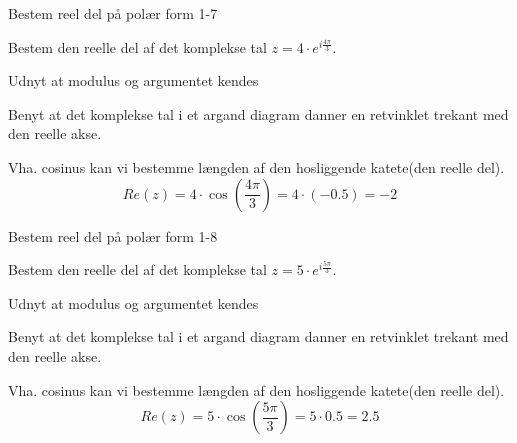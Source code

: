 \documentclass{article}
\begin{document}
\newpage

\begin{exercise}{Bestem reel del på polær form 1-7}
	
	
Bestem den reelle del af det komplekse tal $z=4 \cdot e^{i \frac{4 \pi}{3}}$.



\hint 

Udnyt at modulus og argumentet kendes


\hint

Benyt at det komplekse tal i et argand diagram danner en retvinklet trekant med den reelle akse. 

\hint 

Vha. cosinus kan vi bestemme længden af den hosliggende katete(den reelle del).
\[
Re(z) =  4 \cdot \cos\left(\frac{4 \pi}{3} \right) = 4 \cdot (-0.5) = -2
\]
	
\end{exercise}

\newpage

\begin{exercise}{Bestem reel del på polær form 1-8}
	
	
Bestem den reelle del af det komplekse tal $z=5 \cdot e^{i \frac{5 \pi}{3}}$.



\hint 

Udnyt at modulus og argumentet kendes


\hint

Benyt at det komplekse tal i et argand diagram danner en retvinklet trekant med den reelle akse. 

\hint 

Vha. cosinus kan vi bestemme længden af den hosliggende katete(den reelle del).
\[
Re(z) =  5 \cdot \cos\left(\frac{5 \pi}{3} \right) = 5 \cdot 0.5 = 2.5
\]
	
\end{exercise}
\end{document}
